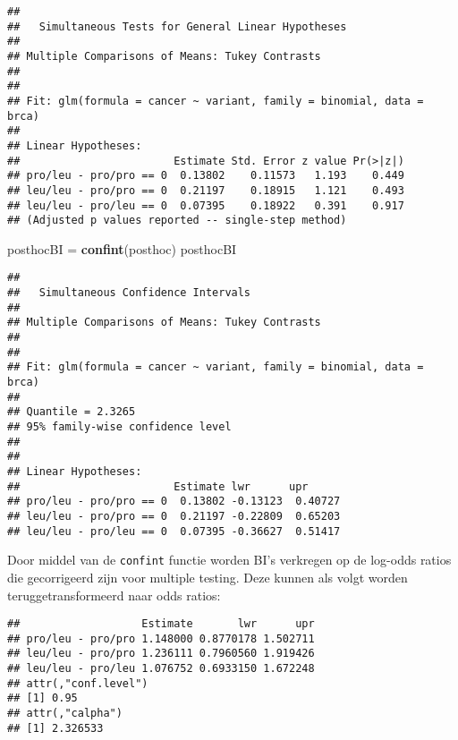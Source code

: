 \documentclass[12pt,dutch,coursenotes]{book}
\newenvironment{Shaded}{\begin{snugshade}}{\end{snugshade}}
\newcommand{\KeywordTok}[1]{\textcolor[rgb]{0.13,0.29,0.53}{\textbf{#1}}}
\newcommand{\StringTok}[1]{\textcolor[rgb]{0.31,0.60,0.02}{#1}}
\newcommand{\OperatorTok}[1]{\textcolor[rgb]{0.81,0.36,0.00}{\textbf{#1}}}
\newcommand{\NormalTok}[1]{#1}
\theoremstyle{definition}
\theoremstyle{definition}
\theoremstyle{definition}
\theoremstyle{remark}
\begin{document}
\begin{verbatim}
## 
##   Simultaneous Tests for General Linear Hypotheses
## 
## Multiple Comparisons of Means: Tukey Contrasts
## 
## 
## Fit: glm(formula = cancer ~ variant, family = binomial, data = brca)
## 
## Linear Hypotheses:
##                        Estimate Std. Error z value Pr(>|z|)
## pro/leu - pro/pro == 0  0.13802    0.11573   1.193    0.449
## leu/leu - pro/pro == 0  0.21197    0.18915   1.121    0.493
## leu/leu - pro/leu == 0  0.07395    0.18922   0.391    0.917
## (Adjusted p values reported -- single-step method)
\end{verbatim}

\begin{Shaded}
\begin{Highlighting}[]
\NormalTok{posthocBI =}\StringTok{ }\KeywordTok{confint}\NormalTok{(posthoc)}
\NormalTok{posthocBI}
\end{Highlighting}
\end{Shaded}

\begin{verbatim}
## 
##   Simultaneous Confidence Intervals
## 
## Multiple Comparisons of Means: Tukey Contrasts
## 
## 
## Fit: glm(formula = cancer ~ variant, family = binomial, data = brca)
## 
## Quantile = 2.3265
## 95% family-wise confidence level
##  
## 
## Linear Hypotheses:
##                        Estimate lwr      upr     
## pro/leu - pro/pro == 0  0.13802 -0.13123  0.40727
## leu/leu - pro/pro == 0  0.21197 -0.22809  0.65203
## leu/leu - pro/leu == 0  0.07395 -0.36627  0.51417
\end{verbatim}

Door middel van de \texttt{confint} functie worden BI's verkregen op de
log-odds ratios die gecorrigeerd zijn voor multiple testing. Deze kunnen
als volgt worden teruggetransformeerd naar odds ratios:

\begin{Shaded}
\end{Shaded}

\begin{verbatim}
##                   Estimate       lwr      upr
## pro/leu - pro/pro 1.148000 0.8770178 1.502711
## leu/leu - pro/pro 1.236111 0.7960560 1.919426
## leu/leu - pro/leu 1.076752 0.6933150 1.672248
## attr(,"conf.level")
## [1] 0.95
## attr(,"calpha")
## [1] 2.326533
\end{verbatim}
\end{document}
